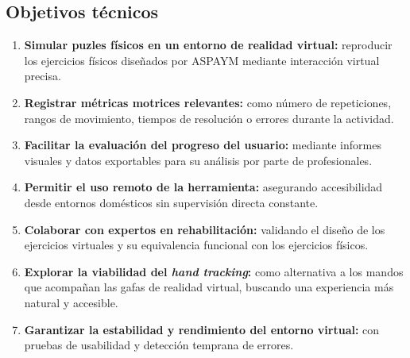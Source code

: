 \subsection{Objetivos técnicos}
\label{Objetivos técnicos}
\begin{enumerate}
    \item \textbf{Simular puzles físicos en un entorno de realidad virtual:} reproducir los ejercicios físicos diseñados por ASPAYM mediante interacción virtual precisa.
    
    \item \textbf{Registrar métricas motrices relevantes:} como número de repeticiones, rangos de movimiento, tiempos de resolución o errores durante la actividad.
    
    \item \textbf{Facilitar la evaluación del progreso del usuario:} mediante informes visuales y datos exportables para su análisis por parte de profesionales.
    
    \item \textbf{Permitir el uso remoto de la herramienta:} asegurando accesibilidad desde entornos domésticos sin supervisión directa constante.
    
    \item \textbf{Colaborar con expertos en rehabilitación:} validando el diseño de los ejercicios virtuales y su equivalencia funcional con los ejercicios físicos.
    
    \item \textbf{Explorar la viabilidad del \textit{hand tracking}:} como alternativa a los mandos que acompañan las gafas de realidad virtual, buscando una experiencia más natural y accesible.
    
    \item \textbf{Garantizar la estabilidad y rendimiento del entorno virtual:} con pruebas de usabilidad y detección temprana de errores.
\end{enumerate}

